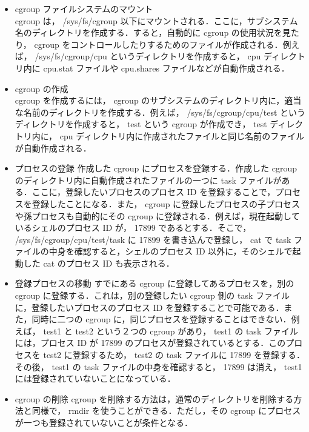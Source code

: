 \documentclass[graduation-thesis]{jsarticle}
\begin{document}
\begin{itemize}
	\item{cgroup ファイルシステムのマウント}\\
	cgroup は， /sys/fs/cgroup 以下にマウントされる．ここに，サブシステム名のディレクトリを作成する．すると，自動的に cgroup の使用状況を見たり， cgroup をコントロールしたりするためのファイルが作成される．例えば， /sys/fs/cgroup/cpu というディレクトリを作成すると， cpu ディレクトリ内に cpu.stat ファイルや cpu.shares ファイルなどが自動作成される．\\
	\item{cgroup の作成}\\
	cgroup を作成するには， cgroup のサブシステムのディレクトリ内に，適当な名前のディレクトリを作成する．例えば， /sys/fs/cgroup/cpu/test というディレクトリを作成すると， test という cgroup が作成でき， test ディレクトリ内に， cpu ディレクトリ内に作成されたファイルと同じ名前のファイルが自動作成される．\\
	\item{プロセスの登録}
	作成した cgroup にプロセスを登録する．作成した cgroup のディレクトリ内に自動作成されたファイルの一つに task ファイルがある．ここに，登録したいプロセスのプロセス ID を登録することで，プロセスを登録したことになる．また， cgroup に登録したプロセスの子プロセスや孫プロセスも自動的にその cgroup に登録される．例えば，現在起動しているシェルのプロセス ID が， 17899 であるとする．そこで， /sys/fs/cgroup/cpu/test/task に 17899 を書き込んで登録し， cat で task ファイルの中身を確認すると，シェルのプロセス ID 以外に，そのシェルで起動した cat のプロセス ID も表示される．\\
	\item{登録プロセスの移動}
	すでにある cgroup に登録してあるプロセスを，別の cgroup に登録する．これは，別の登録したい cgroup  側の task ファイルに，登録したいプロセスのプロセス ID を登録することで可能である．また，同時に二つの cgroup に，同じプロセスを登録することはできない．例えば， test1 と test2 という２つの cgroup があり， test1 の task ファイルには，プロセス ID が 17899 のプロセスが登録されているとする．このプロセスを test2 に登録するため， test2 の task ファイルに 17899 を登録する．その後， test1 の task ファイルの中身を確認すると， 17899 は消え， test1 には登録されていないことになっている．\\
	\item{cgroup の削除}
	cgroup を削除する方法は，通常のディレクトリを削除する方法と同様で， rmdir を使うことができる．ただし，その cgroup にプロセスが一つも登録されていないことが条件となる．\\
\end{itemize}
\end{document}
